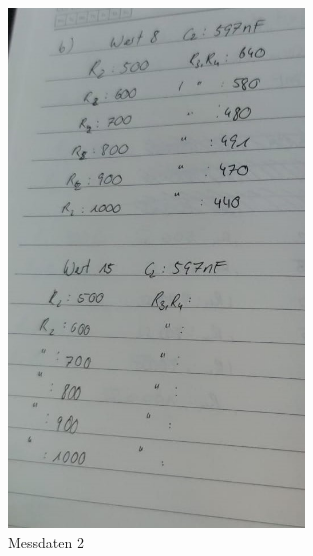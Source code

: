 \begin{figure}
  \centering
  \includegraphics[width=0.7\textwidth]{M_b).jpeg}
  \caption{Messdaten 2}
  \label{fig:M2}
\end{figure}

